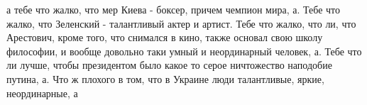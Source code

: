  
 
 
 
 

а тебе что жалко, что мер Киева - боксер, причем чемпион мира, а. Тебе что
жалко, что Зеленский - талантливый актер и артист. Тебе что жалко, что ли, что
Арестович, кроме того, что снимался в кино, также основал свою школу философии,
и вообще довольно таки умный и неординарный человек, а. Тебе что ли лучше,
чтобы президентом было какое то серое ничтожество наподобие путина, а. Что ж
плохого в том, что в Украине люди талантливые, яркие, неординарные, а
